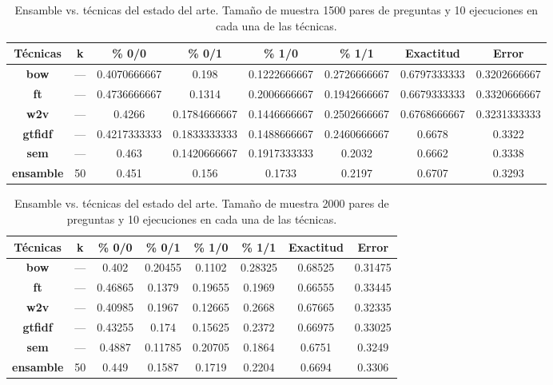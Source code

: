 \begin{table}[]
	\centering
	\footnotesize
	\begin{tabular}{|c|c|c|c|c|c|c|c|}
		\hline
		\rowcolor[HTML]{CFE2F3}
		\textbf{Técnicas} &
		\textbf{k} &
		\textbf{\% 0/0} &
		\textbf{\% 0/1} &
		\textbf{\% 1/0} &
		\textbf{\% 1/1} &
		\textbf{Exactitud} &
		\textbf{Error} \\ \hline
		\textbf{bow} &
		--- &
		0.4070666667 &
		0.198 &
		0.1222666667 &
		0.2726666667 &
		\cellcolor[HTML]{D9EAD3}0.6797333333 &
		\cellcolor[HTML]{D9EAD3}0.3202666667 \\ \hline
		\textbf{ft}       & --- & 0.4736666667 & 0.1314       & 0.2006666667 & 0.1942666667 & 0.6679333333 & 0.3320666667 \\ \hline
		\textbf{w2v}      & --- & 0.4266       & 0.1784666667 & 0.1446666667 & 0.2502666667 & 0.6768666667 & 0.3231333333 \\ \hline
		\textbf{gtfidf}   & --- & 0.4217333333 & 0.1833333333 & 0.1488666667 & 0.2460666667 & 0.6678       & 0.3322       \\ \hline
		\textbf{sem}      & --- & 0.463        & 0.1420666667 & 0.1917333333 & 0.2032       & 0.6662       & 0.3338       \\ \hline
		\textbf{ensamble} & 50  & 0.451        & 0.156        & 0.1733       & 0.2197       & 0.6707       & 0.3293       \\ \hline
	\end{tabular}
	\caption{Ensamble vs. técnicas del estado del arte. Tamaño de muestra 1500 pares de preguntas y 10 ejecuciones en cada una de las técnicas.}
	\label{tab:equal-eda-1500}
\end{table}

\begin{table}[]
	\centering
	\footnotesize
	\begin{tabular}{|c|c|c|c|c|c|c|c|}
		\hline
		\rowcolor[HTML]{CFE2F3}
		\textbf{Técnicas} &
		\textbf{k} &
		\textbf{\% 0/0} &
		\textbf{\% 0/1} &
		\textbf{\% 1/0} &
		\textbf{\% 1/1} &
		\textbf{Exactitud} &
		\textbf{Error} \\ \hline
		\textbf{bow} &
		--- &
		0.402 &
		0.20455 &
		0.1102 &
		0.28325 &
		\cellcolor[HTML]{D9EAD3}0.68525 &
		\cellcolor[HTML]{D9EAD3}0.31475 \\ \hline
		\textbf{ft}       & --- & 0.46865 & 0.1379  & 0.19655 & 0.1969 & 0.66555 & 0.33445 \\ \hline
		\textbf{w2v}      & --- & 0.40985 & 0.1967  & 0.12665 & 0.2668 & 0.67665 & 0.32335 \\ \hline
		\textbf{gtfidf}   & --- & 0.43255 & 0.174   & 0.15625 & 0.2372 & 0.66975 & 0.33025 \\ \hline
		\textbf{sem}      & --- & 0.4887  & 0.11785 & 0.20705 & 0.1864 & 0.6751  & 0.3249  \\ \hline
		\textbf{ensamble} & 50  & 0.449   & 0.1587  & 0.1719  & 0.2204 & 0.6694  & 0.3306  \\ \hline
	\end{tabular}
	\caption{Ensamble vs. técnicas del estado del arte. Tamaño de muestra 2000 pares de preguntas y 10 ejecuciones en cada una de las técnicas.}
	\label{tab:equal-eda-2000}
\end{table}

